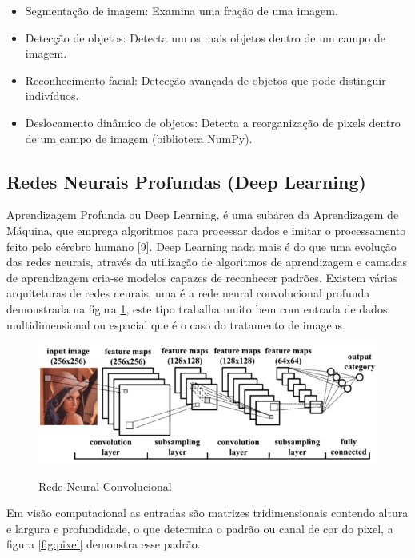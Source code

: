 \begin{itemize}
    \item Segmentação de imagem: Examina uma fração de uma imagem.
    \item Detecção de objetos: Detecta um os mais objetos dentro de um campo de imagem.
    \item Reconhecimento facial: Detecção avançada de objetos que pode distinguir indivíduos.
    \item Deslocamento dinâmico de objetos: Detecta a reorganização de pixels dentro de um campo de imagem (biblioteca NumPy).
\end{itemize}
\subsection{Redes Neurais Profundas (Deep Learning)}
Aprendizagem Profunda ou Deep Learning, é uma subárea da Aprendizagem de Máquina, que emprega algoritmos para processar dados e imitar o processamento feito pelo cérebro humano [9].
Deep Learning nada mais é do que uma evolução das redes neurais, através da utilização de algoritmos de aprendizagem e camadas de aprendizagem cria-se modelos capazes de reconhecer padrões.
Existem várias arquiteturas de redes neurais, uma é a rede neural convolucional profunda demonstrada na figura \ref{fig:neuralConv}, este tipo trabalha muito bem com entrada de dados multidimensional ou espacial que é o caso do tratamento de imagens. 

\begin{figure}[H]
  \centering
  \caption{Rede Neural Convolucional}
  \includegraphics[scale=.6]{figs/neuralConv.png}
  \label{fig:neuralConv}
\end{figure}

Em visão computacional as entradas são matrizes tridimensionais contendo altura e largura e profundidade, o que determina o padrão ou canal de cor do pixel, a figura \ref{fig:pixel} demonstra esse padrão.

